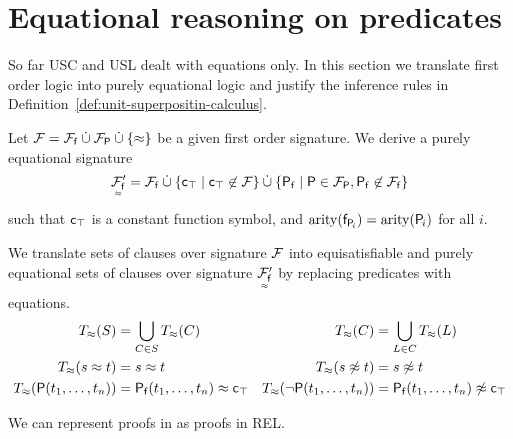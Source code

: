     \section{Equational reasoning on predicates}\label{sec:equational:reasoning:on:predicates}

    So far USC and USL dealt
    with equations only.
    In this section we translate first order logic
    into purely equational logic and
    justify the inference rules in Definition~\vref{def:unit-superpositin-calculus}.

    \begin{definition}
        Let \( \mathcal{F} = {\mathcal{F}_{\mathsf{f}}} \mathbin{\dot\cup} {\mathcal{F}_{\mathsf{P}}} \mathbin{\dot\cup} \{\approx \} \) be a given first order signature.
        We derive a purely equational signature
        \[
            \underset{^\approx}{\mathcal{F}'_{\mathsf{f}}} = {\mathcal{F}_{\mathsf{f}}}
 \mathbin{\dot\cup}
            \{ \mathsf{c}_\top \mid \mathsf{c}_\top\not\in\mathcal{F} \}
 \mathbin{\dot\cup}
            \{ \mathsf{P}_{\mathsf{f}} \mid \mathsf{P} \in {\mathcal{F}_{\mathsf{P}}}, \mathsf{P}_{\mathsf{f}}\not\in{\mathcal{F}_{\mathsf{f}}} \}
            \]
        such that \( \mathsf{c}_\top \) is a constant function symbol,
        and \( \operatorname{arity}(\mathsf{f}_{\mathsf{P}_{\!i}}) = \operatorname{arity}(\mathsf{P}_{\!i}) \) for all \( i \).

    \end{definition}

    \begin{definition}
        We translate sets of clauses over signature \( \mathcal{F} \)
        into equisatisfiable and purely equational sets of clauses over signature
        \( \underset{^\approx}{\mathcal{F}'_{\mathsf{f}}} \)
        by replacing predicates with equations.
        \begin{align*}
            T_\approx(S) &= \bigcup_{C\in S} T_\approx(C) &
            T_\approx(C) &= \bigcup_{L\in C} T_\approx(L) \\
            T_\approx(s\approx t) &= s\approx t &
            T_\approx(s\not\approx t) &= s\not\approx t \\
            T_\approx(\mathsf{P}(t_1,\ldots,t_n)) &= \mathsf{P}_{\mathsf{f}}(t_1,\ldots,t_n)\approx\mathsf{c}_\top &
            T_\approx(\lnot\mathsf{P}(t_1,\ldots,t_n)) &= \mathsf{P}_{\mathsf{f}}(t_1,\ldots,t_n)\not\approx\mathsf{c}_\top
        \end{align*}
    \end{definition}


    \begin{corollary}
        We can represent proofs in \InstGenEQ{}
        as proofs in {REL}.
    \end{corollary}

